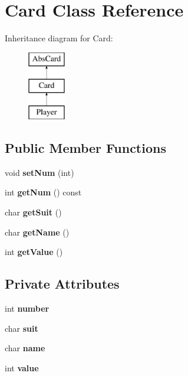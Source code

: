 \hypertarget{class_card}{}\section{Card Class Reference}
\label{class_card}
Inheritance diagram for Card\+:\begin{figure}[H]
\begin{center}
\leavevmode
\includegraphics[height=3.000000cm]{class_card}
\end{center}
\end{figure}
\subsection*{Public Member Functions}
\begin{DoxyCompactItemize}
\item 
\hypertarget{class_card_ae45525322c984d687aef5fef969a7197}{}\label{class_card_ae45525322c984d687aef5fef969a7197} 
void {\bfseries set\+Num} (int)
\item 
\hypertarget{class_card_afdd26a7d861f1dae28dd967b3491fdd3}{}\label{class_card_afdd26a7d861f1dae28dd967b3491fdd3} 
int {\bfseries get\+Num} () const
\item 
\hypertarget{class_card_abfb09282f9920c235b464fb7f714b56c}{}\label{class_card_abfb09282f9920c235b464fb7f714b56c} 
char {\bfseries get\+Suit} ()
\item 
\hypertarget{class_card_a7b4e9a445eebedb4aa38cb9320a48207}{}\label{class_card_a7b4e9a445eebedb4aa38cb9320a48207} 
char {\bfseries get\+Name} ()
\item 
\hypertarget{class_card_a3df85ce283a6e38b719ffe25f3d4610a}{}\label{class_card_a3df85ce283a6e38b719ffe25f3d4610a} 
int {\bfseries get\+Value} ()
\end{DoxyCompactItemize}
\subsection*{Private Attributes}
\begin{DoxyCompactItemize}
\item 
\hypertarget{class_card_ad4ebd4bfe9458aeef44714093b4e2c5c}{}\label{class_card_ad4ebd4bfe9458aeef44714093b4e2c5c} 
int {\bfseries number}
\item 
\hypertarget{class_card_a164b95e624c7e21134ba535ddb28963b}{}\label{class_card_a164b95e624c7e21134ba535ddb28963b} 
char {\bfseries suit}
\item 
\hypertarget{class_card_af488f1f1bc0cfbbfe9a10676429ca1c1}{}\label{class_card_af488f1f1bc0cfbbfe9a10676429ca1c1} 
char {\bfseries name}
\item 
\hypertarget{class_card_a57c4269cef032dac1f282c9b2be3be4d}{}\label{class_card_a57c4269cef032dac1f282c9b2be3be4d} 
int {\bfseries value}
\end{DoxyCompactItemize}



